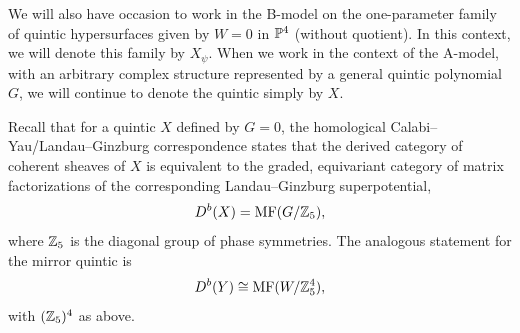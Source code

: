 We will also have occasion to work in the B-model on the one-parameter family 
of quintic hypersurfaces given by $W=0$ in ${\mathbb P}^4$ (without quotient). 
In this context, we will denote this family by $X_\psi$. When we work in the
context of the A-model, with an arbitrary complex structure represented
by a general quintic polynomial $G$, we will 
continue to denote the quintic simply by $X$.

Recall that for a quintic $X$ defined by $G=0$, the homological Calabi--Yau/Landau--Ginzburg 
correspondence \cite{stability,orlov,Aspinwall:2006ib,hhp} states that the 
derived category of coherent sheaves of $X$ is equivalent to the graded, 
equivariant category of matrix factorizations of the corresponding 
Landau--Ginzburg superpotential,
\begin{equation}
\eqlabel{cylgquintic}
D^b(X) = \MF(G/\zet_5) ,
\end{equation}
where ${\mathbb Z}_5$ is the diagonal group of phase symmetries. The analogous
statement for 
the mirror quintic is
\begin{equation}
\eqlabel{cylgmirror}
D^b(Y) \cong \MF(W/\zet_5^4) ,
\end{equation}
with $({\mathbb Z}_5)^4$ as above.

